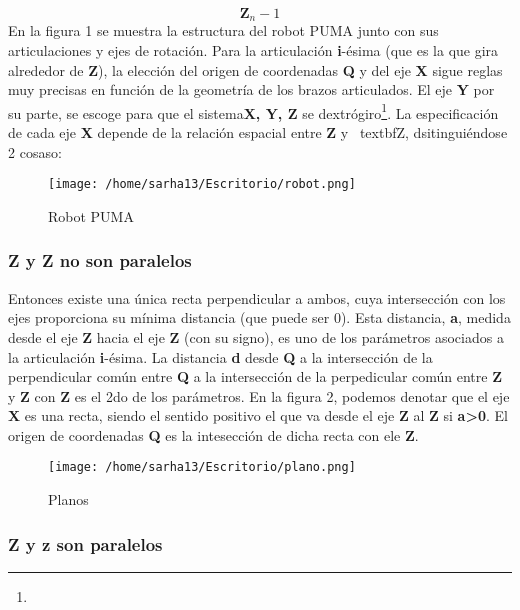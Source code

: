 \documentclass[letter,openright,12pt,spanish]{report}
\begin{document}
\begin{displaymath}
\textbf{Z}_n-1
\end{displaymath}
En la figura 1 se muestra la estructura del robot PUMA junto con sus articulaciones y ejes de rotaci\'on.
Para la articulaci\'on \textbf{i}-\'esima (que es la que gira alrededor de \textbf{Z}), la elecci\'on del origen de coordenadas \textbf{Q} y del eje \textbf{X} sigue reglas muy precisas en funci\'on de la geometr\'ia de los brazos articulados. El eje \textbf{Y} por su parte, se escoge para que el sistema{\textbf{X, Y, Z}} se dextr\'ogiro\footnote{}. La especificaci\'on de cada eje \textbf{X} depende de la relaci\'on espacial entre \textbf{Z} y \ textbf{Z}, dsitingui\'endose 2 cosaso:

\begin{figure}[htp]
\centering
\texttt{[image: /home/sarha13/Escritorio/robot.png]}
\caption{Robot PUMA}
\label{Figura 1.}
\end{figure}

\subsubsection{Z y Z no son paralelos}

Entonces existe una \'unica recta perpendicular a ambos, cuya intersecci\'on con los ejes proporciona su m\'inima distancia (que puede ser 0). Esta distancia, \textbf{a}, medida desde el eje \textbf{Z} hacia el eje \textbf{Z} (con su signo), es uno de los par\'ametros asociados a la articulaci\'on \textbf{i}-\'esima. 
La distancia \textbf{d} desde \textbf{Q} a la intersecci\'on de la perpendicular com\'un entre \textbf{Q} a la intersecci\'on de la perpedicular com\'un entre \textbf{Z} y \textbf{Z} con \textbf{Z} es el 2do de los par\'ametros.
En la figura 2, podemos denotar que el eje \textbf{X} es una recta, siendo el sentido positivo el que va desde el eje \textbf{Z} al \textbf{Z} si \textbf{a>0}.
El origen de coordenadas \textbf{Q} es la intesecci\'on de dicha recta con ele \textbf{Z}.

\begin{figure}[htp]
\centering
\texttt{[image: /home/sarha13/Escritorio/plano.png]}
\caption{Planos}
\label{Figura 2.}
\end{figure}

\subsubsection{Z y z son paralelos}
\end{document}
